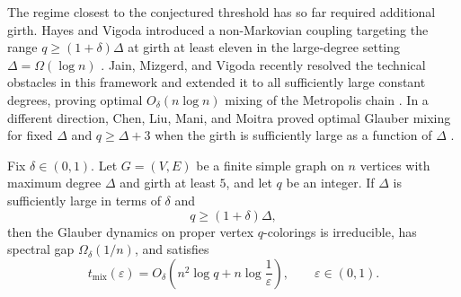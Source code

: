 \documentclass[a4paper,12pt]{article}
\theoremstyle{plain}
\theoremstyle{definition}
\begin{document}
The regime closest to the conjectured threshold has so far required
additional girth.  Hayes and Vigoda introduced a non-Markovian coupling
targeting the range $q\geq(1+\delta)\Delta$ at girth at least eleven in the
large-degree setting $\Delta=\Omega(\log n)$
\cite{HayesVigoda2003}.  Jain, Mizgerd, and Vigoda recently resolved the
technical obstacles in this framework and extended it to all sufficiently
large constant degrees, proving optimal $O_\delta(n\log n)$ mixing of the
Metropolis chain \cite{JMV2026}.  In a different direction, Chen, Liu, Mani,
and Moitra
proved optimal Glauber mixing for fixed $\Delta$ and $q\geq\Delta+3$ when
the girth is sufficiently large as a function of $\Delta$
\cite{CLMM2023}.


\begin{theorem}%
\label{thm:main}
Fix $\delta\in(0,1)$.  Let $G=(V,E)$ be a finite simple graph on $n$
vertices with maximum degree $\Delta$ and girth at least $5$, and let $q$
be an integer.  If $\Delta$ is sufficiently large in terms of $\delta$ and
\[
  q\geq (1+\delta)\Delta,
\]
then the Glauber dynamics on proper vertex $q$-colorings is irreducible,
has spectral gap
$\Omega_\delta(1/n)$, and satisfies
\[
  t_{\mathrm{mix}}(\varepsilon)
  =O_\delta\left(n^2\log q+n\log\frac1\varepsilon\right),
  \qquad \varepsilon\in(0,1).
\]
\end{theorem}

\end{document}
